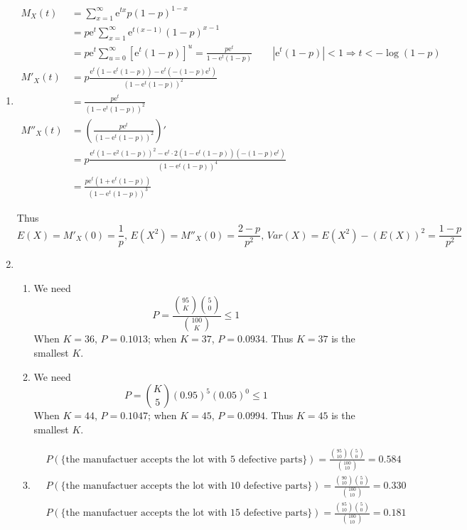 \documentclass{article}
\begin{document}
\begin{enumerate}[leftmargin = 0 em, label = \arabic*., font = \bfseries]
\item
\begin{align*}
M_{X}(t) &= \sum_{x = 1}^\infty \mathrm{e}^{tx} p ( 1- p )^{1 - x}\\
& = p \mathrm{e}^{t} \sum_{x = 1}^\infty \mathrm{e}^{t(x-1)} (1- p)^{x-1} \\
& =  p \mathrm{e}^{t} \sum_{u = 0}^\infty [\mathrm{e}^{t} (1- p)]^{u} = \frac{p \mathrm{e}^t}{1 - \mathrm{e}^{t}(1 - p)}\qquad |\mathrm{e}^t(1-p)| <1 \Rightarrow t< -\log(1-p)\\
M'_{X}(t) &= p\frac{\mathrm{e}^{t}(1- \mathrm{e}^t(1-p)) - \mathrm{e}^t (- (1-p)\mathrm{e}^t)}{(1- \mathrm{e}^t( 1- p))^2} \\
&= \frac{p \mathrm{e}^t}{(1- \mathrm{e}^t (1-p))^2}\\
M''_X(t) &= \left(\frac{p \mathrm{e}^t}{(1- \mathrm{e}^t (1-p))^2}\right)' \\
&= p \frac{\mathrm{e}^t (1 - \mathrm{e}^2 (1 - p))^2 - \mathrm{e}^t \cdot 2(1 - \mathrm{e}^t (1 - p))(-(1 - p) \mathrm{e}^t)}{(1 - \mathrm{e}^t (1-p))^4} \\
&= \frac{p \mathrm{e}^t (1 + \mathrm{e}^t(1-p))}{(1 - \mathrm{e}^t(1 - p))^3}
\end{align*}

Thus
\[E(X) = M'_X (0) = \frac{1}{p},\, E(X^2)=M''_X (0) = \frac{2 - p}{p^2},\, Var(X) = E(X^2) - (E(X))^2 = \frac{1 - p}{p^2}\]


\item
\begin{enumerate}
	\item We need
	\[P = \frac{\binom{95}{K} \binom{5}{0}}{\binom{100}{K}} \leq 1\]
When $K = 36$, $P = 0.1013$; when $K = 37$, $P = 0.0934$. Thus $K = 37$ is the smallest $K$.

\item
We need 
\[ P = \binom{K}{5}(0.95)^5 (0.05)^0 \leq 1\]
When $K = 44$, $P = 0.1047$; when $K = 45$, $P = 0.0994$. Thus $K = 45$ is the smallest $K$.

\item
\begin{align*}
& P(\{\textrm{the manufactuer accepts the lot with 5 defective parts}\}) = \frac{\binom{95}{10} \binom{5}{0}}{\binom{100}{10}} = 0.584 \\
& P(\{\textrm{the manufactuer accepts the lot with 10 defective parts}\}) = \frac{\binom{90}{10} \binom{5}{0}}{\binom{100}{10}} = 0.330 \\
& P(\{\textrm{the manufactuer accepts the lot with 15 defective parts}\}) = \frac{\binom{85}{10} \binom{5}{0}}{\binom{100}{10}} = 0.181
\end{align*}


\end{enumerate}
\end{enumerate}
\end{document}
